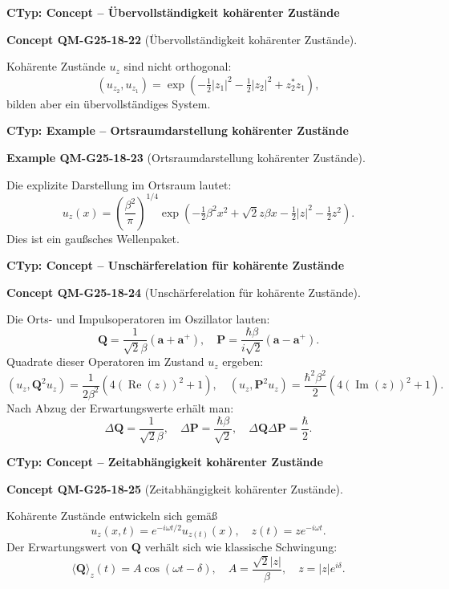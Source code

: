 \documentclass[10pt, letterpaper]{article}
\newcommand{\CustomHeading}[3]{%
  \par\medskip\noindent%
  \textbf{#1 #2} \textnormal{(#3)}.\enskip%
}
\newenvironment{EXA}[2]{\begin{unitbox}\CustomHeading{Example}{#1}{#2}}{\end{unitbox}}
\newenvironment{CONC}[2]{\begin{unitbox}\CustomHeading{Concept}{#1}{#2}}{\end{unitbox}}
\begin{document}
\textbf{CTyp: Concept – Übervollständigkeit kohärenter Zustände}

\begin{CONC}{QM-G25-18-22}{Übervollständigkeit kohärenter Zustände}
Kohärente Zustände $u_z$ sind nicht orthogonal:
\[
(u_{z_2}, u_{z_1}) = \exp\left(-\tfrac{1}{2}|z_1|^2 - \tfrac{1}{2}|z_2|^2 + z_2^* z_1\right),
\]
bilden aber ein übervollständiges System.
\end{CONC}


\textbf{CTyp: Example – Ortsraumdarstellung kohärenter Zustände}

\begin{EXA}{QM-G25-18-23}{Ortsraumdarstellung kohärenter Zustände}
Die explizite Darstellung im Ortsraum lautet:
\[
u_z(x) = \left( \frac{\beta^2}{\pi} \right)^{1/4} \exp\left( -\tfrac{1}{2} \beta^2 x^2 + \sqrt{2} z \beta x - \tfrac{1}{2}|z|^2 - \tfrac{1}{2}z^2 \right).
\]
Dies ist ein gaußsches Wellenpaket.
\end{EXA}


\textbf{CTyp: Concept – Unschärferelation für kohärente Zustände}

\begin{CONC}{QM-G25-18-24}{Unschärferelation für kohärente Zustände}
Die Orts- und Impulsoperatoren im Oszillator lauten:
\[
\mathbf{Q} = \frac{1}{\sqrt{2}\beta}(\mathbf{a} + \mathbf{a}^+), \quad \mathbf{P} = \frac{\hbar\beta}{i\sqrt{2}}(\mathbf{a} - \mathbf{a}^+).
\]
Quadrate dieser Operatoren im Zustand $u_z$ ergeben:
\[
\left(u_z, \mathbf{Q}^2 u_z \right) = \frac{1}{2\beta^2} \left( 4 (\operatorname{Re}(z))^2 + 1 \right), \quad
\left(u_z, \mathbf{P}^2 u_z \right) = \frac{\hbar^2 \beta^2}{2} \left( 4 (\operatorname{Im}(z))^2 + 1 \right).
\]
Nach Abzug der Erwartungswerte erhält man:
\[
\Delta \mathbf{Q} = \frac{1}{\sqrt{2}\beta}, \quad \Delta \mathbf{P} = \frac{\hbar \beta}{\sqrt{2}}, \quad \Delta \mathbf{Q} \Delta \mathbf{P} = \frac{\hbar}{2}.
\]
\end{CONC}



\textbf{CTyp: Concept – Zeitabhängigkeit kohärenter Zustände}

\begin{CONC}{QM-G25-18-25}{Zeitabhängigkeit kohärenter Zustände}
Kohärente Zustände entwickeln sich gemäß
\[
u_z(x,t) = e^{-i \omega t/2} u_{z(t)}(x), \quad z(t) = z e^{-i \omega t}.
\]
Der Erwartungswert von $\mathbf{Q}$ verhält sich wie klassische Schwingung:
\[
\langle \mathbf{Q} \rangle_z(t) = A \cos(\omega t - \delta), \quad A = \frac{\sqrt{2} |z|}{\beta}, \quad z = |z| e^{i\delta}.
\]
\end{CONC}
\end{document}
